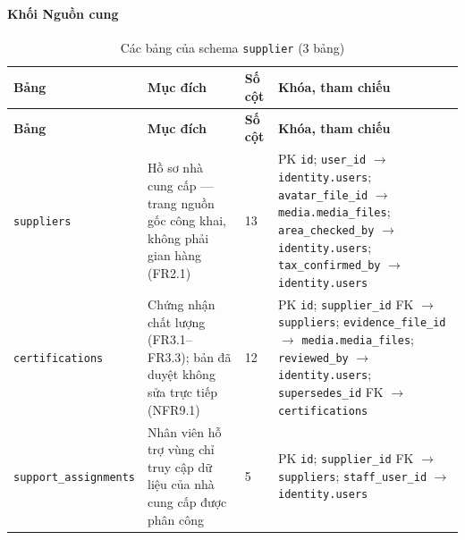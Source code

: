 \paragraph*{Khối Nguồn cung}

\begingroup
\tblsetup\footnotesize\renewcommand{\arraystretch}{1.1}
\begin{longtable}{L{3.20cm} L{5.60cm} L{1.10cm} L{5.00cm}}
\caption{Các bảng của schema \texttt{supplier} (3 bảng)}
\label{tab:db-supplier} \\
\toprule
{}
\textbf{Bảng} & \textbf{Mục đích} & \textbf{Số cột} & \textbf{Khóa, tham chiếu} \\
\midrule
\endfirsthead
\toprule
{}
\textbf{Bảng} & \textbf{Mục đích} & \textbf{Số cột} & \textbf{Khóa, tham chiếu} \\
\midrule
\endhead
\bottomrule
\endfoot
\texttt{suppliers} & Hồ sơ nhà cung cấp — trang nguồn gốc công khai, không phải gian hàng (FR2.1) & 13 & PK \texttt{id}; \texttt{user\_\allowbreak{}id} $\to$ \texttt{identity.users}; \texttt{avatar\_\allowbreak{}file\_\allowbreak{}id} $\to$ \texttt{media.media\_\allowbreak{}files}; \texttt{area\_\allowbreak{}checked\_\allowbreak{}by} $\to$ \texttt{identity.users}; \texttt{tax\_\allowbreak{}confirmed\_\allowbreak{}by} $\to$ \texttt{identity.users} \\
\texttt{certifications} & Chứng nhận chất lượng (FR3.1--FR3.3); bản đã duyệt không sửa trực tiếp (NFR9.1) & 12 & PK \texttt{id}; \texttt{supplier\_\allowbreak{}id} FK $\to$ \texttt{suppliers}; \texttt{evidence\_\allowbreak{}file\_\allowbreak{}id} $\to$ \texttt{media.media\_\allowbreak{}files}; \texttt{reviewed\_\allowbreak{}by} $\to$ \texttt{identity.users}; \texttt{supersedes\_\allowbreak{}id} FK $\to$ \texttt{certifications} \\
\texttt{support\_\allowbreak{}assignments} & Nhân viên hỗ trợ vùng chỉ truy cập dữ liệu của nhà cung cấp được phân công & 5 & PK \texttt{id}; \texttt{supplier\_\allowbreak{}id} FK $\to$ \texttt{suppliers}; \texttt{staff\_\allowbreak{}user\_\allowbreak{}id} $\to$ \texttt{identity.users} \\
\end{longtable}
\endgroup

